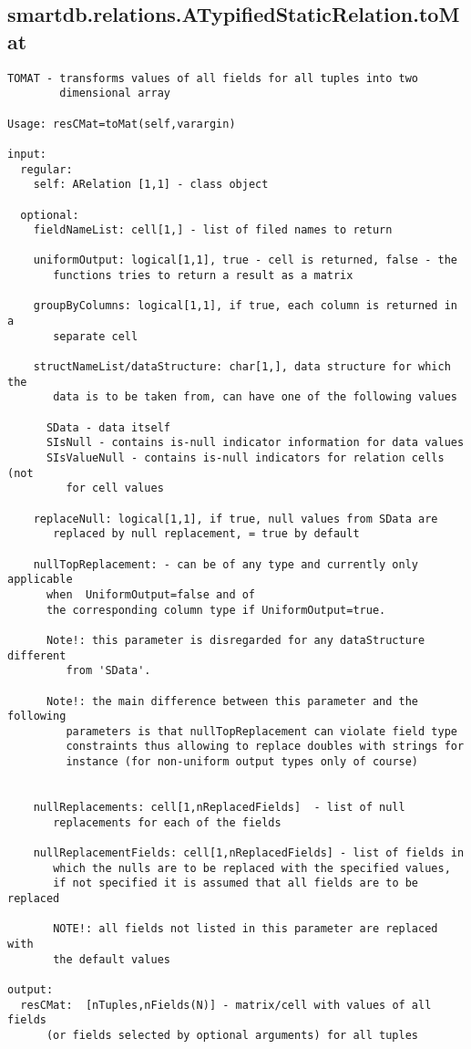 \subsection{\texorpdfstring{smartdb.relations.ATypifiedStaticRelation.toMat}{toMat}}\label{method:smartdb.relations.ATypifiedStaticRelation.toMat}
\begin{verbatim}
TOMAT - transforms values of all fields for all tuples into two
        dimensional array

Usage: resCMat=toMat(self,varargin)

input:
  regular:
    self: ARelation [1,1] - class object

  optional:
    fieldNameList: cell[1,] - list of filed names to return

    uniformOutput: logical[1,1], true - cell is returned, false - the
       functions tries to return a result as a matrix

    groupByColumns: logical[1,1], if true, each column is returned in a
       separate cell

    structNameList/dataStructure: char[1,], data structure for which the
       data is to be taken from, can have one of the following values

      SData - data itself
      SIsNull - contains is-null indicator information for data values
      SIsValueNull - contains is-null indicators for relation cells (not
         for cell values

    replaceNull: logical[1,1], if true, null values from SData are
       replaced by null replacement, = true by default

    nullTopReplacement: - can be of any type and currently only applicable
      when  UniformOutput=false and of
      the corresponding column type if UniformOutput=true.

      Note!: this parameter is disregarded for any dataStructure different
         from 'SData'.

      Note!: the main difference between this parameter and the following
         parameters is that nullTopReplacement can violate field type
         constraints thus allowing to replace doubles with strings for
         instance (for non-uniform output types only of course)


    nullReplacements: cell[1,nReplacedFields]  - list of null
       replacements for each of the fields

    nullReplacementFields: cell[1,nReplacedFields] - list of fields in
       which the nulls are to be replaced with the specified values,
       if not specified it is assumed that all fields are to be replaced

       NOTE!: all fields not listed in this parameter are replaced with
       the default values

output:
  resCMat:  [nTuples,nFields(N)] - matrix/cell with values of all fields
      (or fields selected by optional arguments) for all tuples
\end{verbatim}
